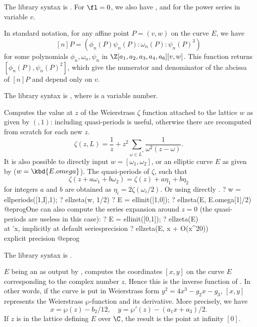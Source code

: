 The library syntax is .
For $\fl = 0$, we also have
, and
 for the power series in
variable $v$.

\label{se:ellxn}
In standard notation, for any affine point $P = (v,w)$ on the
curve $E$, we have
$$[n]P = (\phi_n(P)\psi_n(P) : \omega_n(P) : \psi_n(P)^3)$$
for some polynomials $\phi_n,\omega_n,\psi_n$ in
$\Z[a_1,a_2,a_3,a_4,a_6][v,w]$. This function returns
$[\phi_n(P),\psi_n(P)^2]$, which give the numerator and denominator of
the abcissa of $[n]P$ and depend only on $v$.

The library syntax is , where  is a variable number.

\label{se:ellzeta}
Computes the value at $z$ of the Weierstrass $\zeta$ function attached to
the lattice $w$ as given by $(,1)$: including quasi-periods
is useful, otherwise there are recomputed from scratch for each new $z$.
$$ \zeta(z, L) = \dfrac{1}{z} + z^2\sum_{\omega\in L^*}
\dfrac{1}{\omega^2(z-\omega)}.$$
It is also possible to directly input $w = [\omega_1,\omega_2]$,
or an elliptic curve $E$ as given by  ($w = \kbd{E.omega}$).
The quasi-periods of $\zeta$, such that
$$\zeta(z + a\omega_1 + b\omega_2) = \zeta(z) + a\eta_1 + b\eta_2 $$
for integers $a$ and $b$ are obtained as $\eta_i = 2\zeta(\omega_i/2)$.
Or using directly .
\bprog
? w = ellperiods([1,I],1);
? ellzeta(w, 1/2)
? E = ellinit([1,0]);
? ellzeta(E, E.omega[1]/2)
@eprog\noindent One can also compute the series expansion around $z = 0$
(the quasi-periods are useless in this case):
\bprog
? E = ellinit([0,1]);
? ellzeta(E) \\ at 'x, implicitly at default seriesprecision
? ellzeta(E, x + O(x^20)) \\ explicit precision
@eprog\noindent

The library syntax is .

\label{se:ellztopoint}
$E$ being an  as output by
, computes the coordinates $[x,y]$ on the curve $E$
corresponding to the complex number $z$. Hence this is the inverse function
of . In other words, if the curve is put in Weierstrass
form $y^2 = 4x^3 - g_2x - g_3$, $[x,y]$ represents the Weierstrass
$\wp$-function and its derivative. More
precisely, we have
$$x = \wp(z) - b_2/12,\quad y = \wp'(z) - (a_1 x + a_3)/2.$$
If $z$ is in the lattice defining $E$ over $\C$, the result is the point at
infinity $[0]$.

